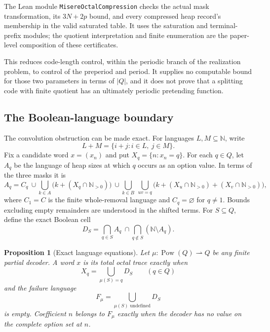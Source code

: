 \documentclass[11pt]{article}
\newtheorem{proposition}[theorem]{Proposition}
\theoremstyle{definition}
\theoremstyle{remark}
\newcommand{\N}{\mathbb N}
\newcommand{\Pow}{\operatorname{Pow}}
\begin{document}
The Lean module \texttt{MisereOctalCompression} checks the actual mask
transformation, its $3N+2p$ bound, and every compressed heap record's
membership in the valid saturated table.  It uses the saturation and
terminal-prefix modules; the quotient interpretation and finite enumeration
are the paper-level composition of these certificates.

This reduces code-length control, within the periodic branch of the
realization problem, to control of the preperiod and period.
It supplies no computable bound for those two parameters in terms of
$|Q|$, and it does not prove that a splitting code with finite quotient
has an ultimately periodic pretending function.

\subsection{The Boolean-language boundary}\label{sec:languages}

The convolution obstruction can be made exact.  For languages
$L,M\subseteq\N$, write
\[
 L+M=\{i+j:i\in L,\ j\in M\}.
\]
Fix a candidate word $x=(x_n)$ and put $X_q=\{n:x_n=q\}$.  For each
$q\in Q$, let $A_q$ be the language of heap sizes at which $q$ occurs as an
option value.  In terms of the three masks it is
\begin{equation}
 A_q=C_q\ \cup\!\bigcup_{k\in A}\bigl(k+(X_q\cap\N_{>0})\bigr)\ \cup\!
 \bigcup_{k\in B}\ \bigcup_{uv=q}
       \bigl(k+(X_u\cap\N_{>0})+(X_v\cap\N_{>0})\bigr),
\end{equation}
where $C_1=C$ is the finite whole-removal language and $C_q=\varnothing$
for $q\ne1$.  Bounds excluding empty remainders are understood in the
shifted terms.  For $S\subseteq Q$, define the exact Boolean cell
\begin{equation}
 D_S=\bigcap_{q\in S}A_q\ \cap\!
     \bigcap_{q\notin S}(\N\setminus A_q).
\end{equation}

\begin{proposition}[Exact language equations]\label{prop:language-equations}
Let $\mu:\Pow(Q)\rightharpoonup Q$ be any finite partial decoder.  A word
$x$ is its total octal trace exactly when
\begin{equation}
 X_q=\bigcup_{\mu(S)=q}D_S\qquad(q\in Q)
\end{equation}
and the failure language
\begin{equation}
 F_\mu=\bigcup_{\mu(S)\text{ undefined}}D_S
\end{equation}
is empty.  Coefficient $n$ belongs to $F_\mu$ exactly when the decoder has no
value on the complete option set at $n$.
\end{proposition}
\end{document}
